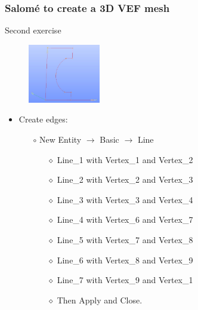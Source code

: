 \documentclass[10pt]{beamer}
\begin{document}
\begin{frame}
\frametitle{Salom\'e to create a 3D VEF mesh}
\begin{block}{Second exercise}

\begin{figure}
\includegraphics[width=0.28\textwidth]{PICTURES/salome7.jpg}
\end{figure}

\begin{itemize}

\item Create edges:
    \begin{itemize}
    \item [$\circ$] New Entity $\rightarrow$ Basic $\rightarrow$ Line
        \begin{itemize}
        \item [$\diamond$] Line\_1 with Vertex\_1 and Vertex\_2
        \item [$\diamond$] Line\_2 with Vertex\_2 and Vertex\_3
        \item [$\diamond$] Line\_3 with Vertex\_3 and Vertex\_4
        \item [$\diamond$] Line\_4 with Vertex\_6 and Vertex\_7
        \item [$\diamond$] Line\_5 with Vertex\_7 and Vertex\_8
        \item [$\diamond$] Line\_6 with Vertex\_8 and Vertex\_9
        \item [$\diamond$] Line\_7 with Vertex\_9 and Vertex\_1
        \item [$\diamond$] Then Apply and Close.
        \end{itemize}
    \end{itemize}
\end{itemize}

\end{block}
\end{frame}
\end{document}

